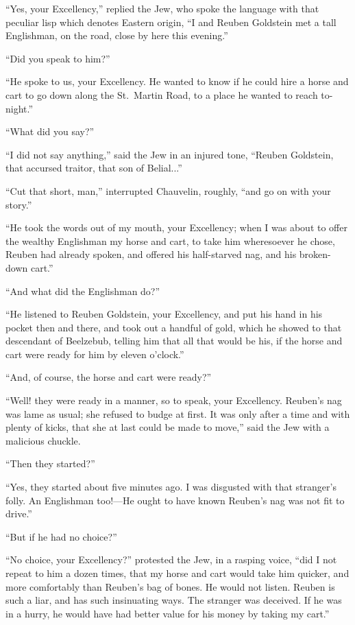 \documentclass[paper=a5,BCOR=7mm,twoside,DIV=calc,12pt,usegeometry,chapterprefix,endperiod,headings=big]{scrbook}
\begin{document}
\enquote{Yes, your Excellency,} replied the Jew, who spoke the language with that peculiar lisp which denotes Eastern origin, \enquote{I and Reuben Goldstein met a tall Englishman, on the road, close by here this evening.}

\enquote{Did you speak to him?}

\enquote{He spoke to us, your Excellency. He wanted to know if he could hire a horse and cart to go down along the St.~Martin Road, to a place he wanted to reach to-night.}

\enquote{What did you say?}

\enquote{I did not say anything,} said the Jew in an injured tone, \enquote{Reuben Goldstein, that accursed traitor, that son of Belial...}

\enquote{Cut that short, man,} interrupted Chauvelin, roughly, \enquote{and go on with your story.}

\enquote{He took the words out of my mouth, your Excellency; when I was about to offer the wealthy Englishman my horse and cart, to take him wheresoever he chose, Reuben had already spoken, and offered his half-starved nag, and his broken-down cart.}

\enquote{And what did the Englishman do?}

\enquote{He listened to Reuben Goldstein, your Excellency, and put his hand in his pocket then and there, and took out a handful of gold, which he showed to that descendant of Beelzebub, telling him that all that would be his, if the horse and cart were ready for him by eleven o'clock.}

\enquote{And, of course, the horse and cart were ready?}

\enquote{Well! they were ready in a manner, so to speak, your Excellency. Reuben's nag was lame as usual; she refused to budge at first. It was only after a time and with plenty of kicks, that she at last could be made to move,} said the Jew with a malicious chuckle.

\enquote{Then they started?}

\enquote{Yes, they started about five minutes ago. I was disgusted with that stranger's folly. An Englishman too!---He ought to have known Reuben's nag was not fit to drive.}

\enquote{But if he had no choice?}

\enquote{No choice, your Excellency?} protested the Jew, in a rasping voice, \enquote{did I not repeat to him a dozen times, that my horse and cart would take him quicker, and more comfortably than Reuben's bag of bones. He would not listen. Reuben is such a liar, and has such insinuating ways. The stranger was deceived. If he was in a hurry, he would have had better value for his money by taking my cart.}
\end{document}

